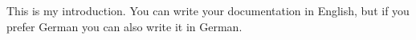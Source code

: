 

\maketitle

This is my introduction.
You can write your documentation in English, but if you prefer German you can also write it in German.